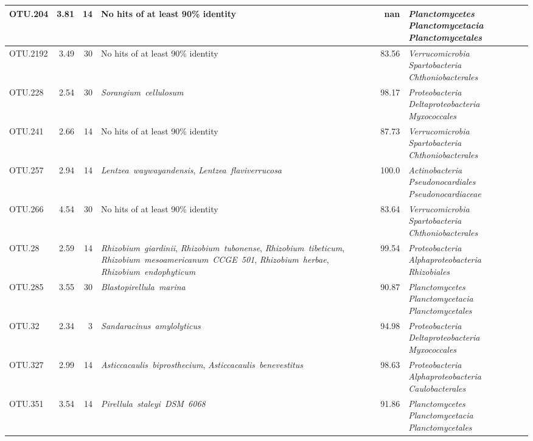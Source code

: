 \begin{ThreePartTable}
\begin{longtable}{lrrP{5cm}rP{5cm}}
OTU.204 & 3.81 & 14 & {No hits of at least 90\% identity} & nan & \mbox{\textit{Planctomycetes}} \mbox{\textit{Planctomycetacia}} \mbox{\textit{Planctomycetales}} \\ \midrule
OTU.2192 & 3.49 & 30 & {No hits of at least 90\% identity} & 83.56 & \mbox{\textit{Verrucomicrobia}} \mbox{\textit{Spartobacteria}} \mbox{\textit{Chthoniobacterales}} \\ \midrule
OTU.228 & 2.54 & 30 & \mbox{\textit{Sorangium cellulosum}} & 98.17 & \mbox{\textit{Proteobacteria}} \mbox{\textit{Deltaproteobacteria}} \mbox{\textit{Myxococcales}} \\ \midrule
OTU.241 & 2.66 & 14 & {No hits of at least 90\% identity} & 87.73 & \mbox{\textit{Verrucomicrobia}} \mbox{\textit{Spartobacteria}} \mbox{\textit{Chthoniobacterales}} \\ \midrule
OTU.257 & 2.94 & 14 & \mbox{\textit{Lentzea waywayandensis}}, \mbox{\textit{Lentzea flaviverrucosa}} & 100.0 & \mbox{\textit{Actinobacteria}} \mbox{\textit{Pseudonocardiales}} \mbox{\textit{Pseudonocardiaceae}} \\ \midrule
OTU.266 & 4.54 & 30 & {No hits of at least 90\% identity} & 83.64 & \mbox{\textit{Verrucomicrobia}} \mbox{\textit{Spartobacteria}} \mbox{\textit{Chthoniobacterales}} \\ \midrule
OTU.28 & 2.59 & 14 & \mbox{\textit{Rhizobium giardinii}}, \mbox{\textit{Rhizobium tubonense}}, \mbox{\textit{Rhizobium tibeticum}}, \mbox{\textit{Rhizobium mesoamericanum CCGE 501}}, \mbox{\textit{Rhizobium herbae}}, \mbox{\textit{Rhizobium endophyticum}} & 99.54 & \mbox{\textit{Proteobacteria}} \mbox{\textit{Alphaproteobacteria}} \mbox{\textit{Rhizobiales}} \\ \midrule
OTU.285 & 3.55 & 30 & \mbox{\textit{Blastopirellula marina}} & 90.87 & \mbox{\textit{Planctomycetes}} \mbox{\textit{Planctomycetacia}} \mbox{\textit{Planctomycetales}} \\ \midrule
OTU.32 & 2.34 & 3 & \mbox{\textit{Sandaracinus amylolyticus}} & 94.98 & \mbox{\textit{Proteobacteria}} \mbox{\textit{Deltaproteobacteria}} \mbox{\textit{Myxococcales}} \\ \midrule
OTU.327 & 2.99 & 14 & \mbox{\textit{Asticcacaulis biprosthecium}}, \mbox{\textit{Asticcacaulis benevestitus}} & 98.63 & \mbox{\textit{Proteobacteria}} \mbox{\textit{Alphaproteobacteria}} \mbox{\textit{Caulobacterales}} \\ \midrule
OTU.351 & 3.54 & 14 & \mbox{\textit{Pirellula staleyi DSM 6068}} & 91.86 & \mbox{\textit{Planctomycetes}} \mbox{\textit{Planctomycetacia}} \mbox{\textit{Planctomycetales}} \\ \midrule

\end{longtable}
\end{ThreePartTable}
